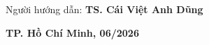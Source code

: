 \documentclass[13pt]{extreport}
\begin{document}
\begin{titlepage}
\begin{flushleft}
    \vspace{0.5cm}

    \vspace{0.6cm}

    \noindent Người hướng dẫn: \textbf{TS. Cái Việt Anh Dũng}
    \end{flushleft}

    \vfill

    {\fontsize{13pt}{15pt}\selectfont\bfseries TP. Hồ Chí Minh, 06/2026}

    \vspace{1.0cm}
\end{titlepage}


\setcounter{page}{1}





%


\tableofcontents
\newpage


{}
\listoffigures
\newpage

{}
\listoftables
\newpage










\newpage
{}
\setcounter{page}{1}
\end{document}
